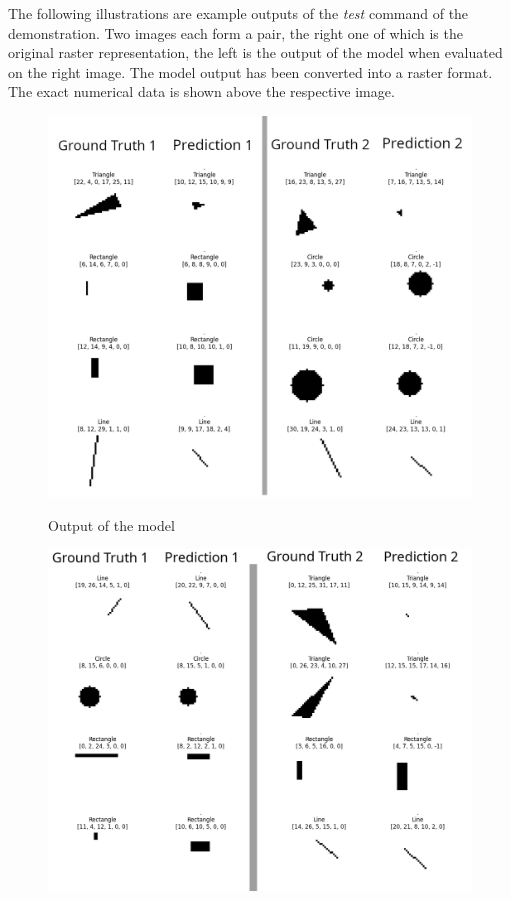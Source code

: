 \documentclass[12pt, a4paper, titlepage]{report}
\begin{document}
\pagebreak

The following illustrations are example outputs of the \emph{test} command of the demonstration. Two images each form a pair, the right one of which is the original raster representation, the left is the output of the model when evaluated on the right image. The model output has been converted into a raster format. The exact numerical data is shown above the respective image.
\vspace{2cm}

\begin{figure}[H]
   \includegraphics[width=1.0\textwidth]{../rc/images/all_shapes_approx_visual1_condensed.png}
   \label{fig:results_demonstration1_condensed}
   \caption{Output of the model}
\end{figure}

\begin{figure}[H]
   \includegraphics[width=1.0\textwidth]{../rc/images/all_shapes_approx_visual2_condensed.png}
   \label{fig:results_demonstration2_condensed}
\end{figure}
\end{document}
